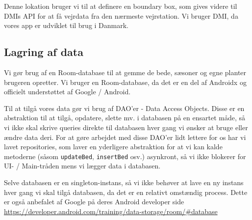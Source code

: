 Denne lokation bruger vi til at definere en boundary box, som gives videre til DMIs API for at få vejrdata fra den nærmeste vejrstation. Vi bruger DMI, da vores app er udviklet til brug i Danmark. 

\subsection{Lagring af data}
Vi gør brug af en Room-database til at gemme de bede, sæsoner og egne planter brugeren opretter. Vi bruger en Room-database, da det er en del af Androidx og officielt understøttet af Google / Android. 

Til at tilgå vores data gør vi brug af DAO'er - Data Access Objects. Disse er en abstraktion til at tilgå, opdatere, slette mv. i databasen på en ensartet måde, så vi ikke skal skrive queries direkte til databasen hver gang vi ønsker at bruge eller ændre data deri.
For at gøre arbejdet med disse DAO'er lidt lettere for os har vi lavet repositories, som laver en yderligere abstraktion for at vi kan kalde metoderne (såsom \texttt{updateBed}, \texttt{insertBed} osv.) asynkront, så vi ikke blokerer for UI- / Main-tråden mens vi lægger data i databasen.

Selve databasen er en singleton-instans, så vi ikke behøver at lave en ny instans hver gang vi skal tilgå databasen, da det er en relativt omstændig process. Dette er også anbefalet af Google på deres Android developer side \hyperlink{https://developer.android.com/training/data-storage/room/#database}{https://developer.android.com/training/data-storage/room/#database}
